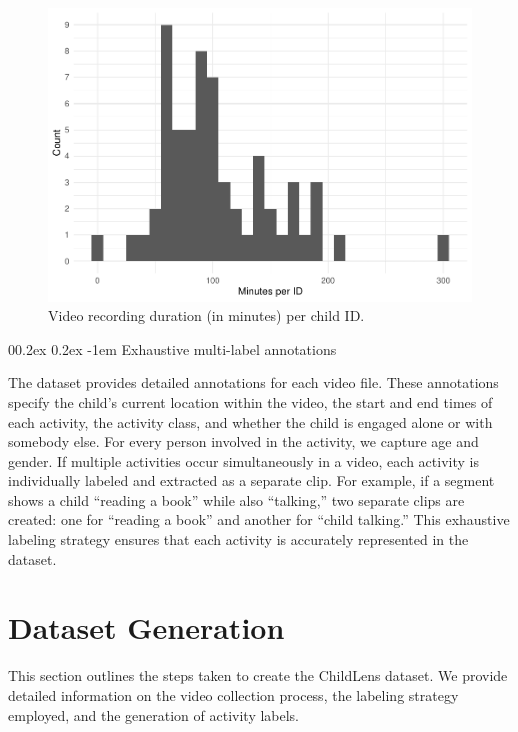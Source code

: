 \documentclass[
  man,floatsintext]{apa6}
\makeatletter
\let\oldparagraph\paragraph
\renewcommand{\paragraph}{
    \@ifstar
      \xxxParagraphStar
      \xxxParagraphNoStar
  }
\newcommand{\xxxParagraphStar}[1]{\oldparagraph*{#1}\mbox{}}
\newcommand{\xxxParagraphNoStar}[1]{\oldparagraph{#1}\mbox{}}
\renewcommand{\paragraph}{\@startsection{paragraph}{4}{\parindent}%
  {0\baselineskip \@plus 0.2ex \@minus 0.2ex}%
  {-1em}%
  {\normalfont\normalsize\bfseries\itshape\typesectitle}}
\makeatother
\begin{document}
\begin{figure}
\centering
\includegraphics{ChildLens_paper_files/figure-latex/minutes-per-child-1.pdf}
\caption{\label{fig:minutes-per-child}Video recording duration (in minutes) per child ID.}
\end{figure}

\paragraph{Exhaustive multi-label annotations}\label{exhaustive-multi-label-annotations}

The dataset provides detailed annotations for each video file. These annotations specify the child's current location within the video, the start and end times of each activity, the activity class, and whether the child is engaged alone or with somebody else. For every person involved in the activity, we capture age and gender. If multiple activities occur simultaneously in a video, each activity is individually labeled and extracted as a separate clip. For example, if a segment shows a child ``reading a book'' while also ``talking,'' two separate clips are created: one for ``reading a book'' and another for ``child talking.'' This exhaustive labeling strategy ensures that each activity is accurately represented in the dataset.

\section{Dataset Generation}\label{dataset-generation}

This section outlines the steps taken to create the ChildLens dataset. We provide detailed information on the video collection process, the labeling strategy employed, and the generation of activity labels.
\end{document}
